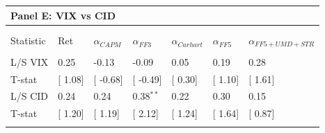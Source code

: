 \documentclass[12pt]{article}
\begin{document}
\begin{table}[!htbp]
\begin{tabularx}{\linewidth}{p{2cm}p{1.5cm}p{1.5cm}p{1.5cm}p{1.5cm}p{1.5cm}p{1.5cm}}
    \toprule
    \multicolumn{7}{l}{\textbf{Panel E: VIX vs CID}} \\
    \midrule  
\\[-1.8ex]\hline 
\hline \\[-1.8ex] 
Statistic & Ret & $\alpha_{CAPM}$ & $\alpha_{FF3}$ & $\alpha_{Carhart}$ & $\alpha_{FF5}$ & $\alpha_{FF5+UMD+STR}$ \\ 
\hline \\[-1.8ex] 
L/S VIX & 0.25 & -0.13 & -0.09 & 0.05 & 0.19 & 0.28 \\ 
T-stat & [ 1.08] & [ -0.68] & [ -0.49] & [ 0.30] & [ 1.10] & [ 1.61] \\ 
L/S CID & 0.24 & 0.24 & 0.38$^{**}$ & 0.22 & 0.30 & 0.15 \\ 
T-stat & [ 1.20] & [ 1.19] & [ 2.12] & [ 1.24] & [ 1.64] & [ 0.87] \\ 
\hline \\[-1.8ex] 
\end{tabularx} 

\end{table} 
\end{document}
